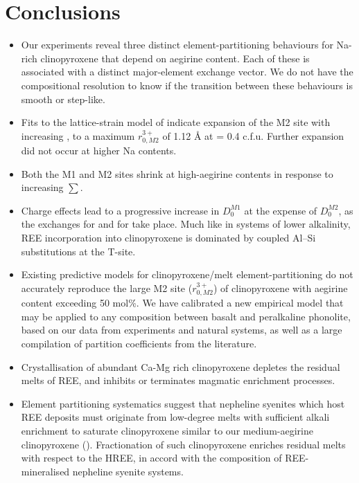 \documentclass[review,authoryear,12pt]{elsarticle}
\begin{document}
\section*{Conclusions}
\begin{itemize}
  \item Our experiments reveal three distinct element-partitioning behaviours for Na-rich clinopyroxene that depend on aegirine content. Each of these is associated with a distinct major-element exchange vector. We do not have the compositional resolution to know if the transition between these behaviours is smooth or step-like.
  
  \item Fits to the lattice-strain model of \citet{Blundy1994} indicate expansion of the M2 site with increasing , to a maximum $r_{0, M2}^{3+}$ of 1.12 \si{\angstrom}{}  at  = 0.4 c.f.u. Further expansion did not occur at higher Na contents.
  
  \item Both the M1  and M2 sites shrink at high-aegirine contents in response to increasing $\sum$.
  
  \item Charge effects lead to a progressive increase in $D_0^{M1}$ at the expense of $D_0^{M2}$, as the exchanges  for  and  for  take place. Much like in systems of lower alkalinity, REE incorporation into clinopyroxene is dominated by coupled Al--Si substitutions at the T-site.
  
  \item Existing predictive models for clinopyroxene/melt element-partitioning do not accurately reproduce the large M2 site ($r_{0,M2}^{3+}$) of clinopyroxene with aegirine content exceeding 50 mol\%. We have calibrated a new empirical model that may be applied to any composition between basalt and peralkaline phonolite, based on our data from experiments and natural systems, as well as a large compilation of partition coefficients from the literature.
  
  \item Crystallisation of abundant Ca-Mg rich clinopyroxene depletes the residual melts of REE, and inhibits or terminates magmatic enrichment processes.

  \item Element partitioning systematics suggest that nepheline syenites which host REE deposits must originate from low-degree melts with sufficient alkali enrichment to saturate clinopyroxene similar to our medium-aegirine clinopyroxene (). Fractionation of such clinopyroxene enriches residual melts with respect to the HREE, in accord with the composition of REE-mineralised nepheline syenite systems.
  
  \end{itemize}
\end{document}
